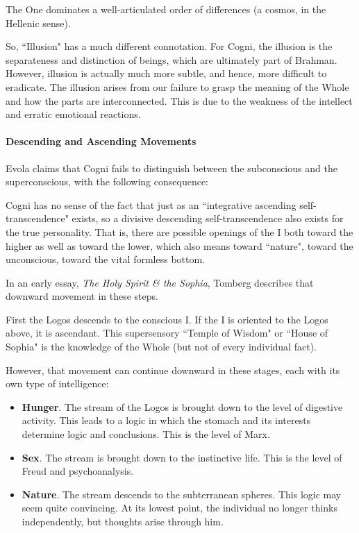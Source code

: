 \begin{quotex}
The One dominates a well-articulated order of differences (a cosmos, in the Hellenic sense). 

\end{quotex}
So, ``Illusion" has a much different connotation. For Cogni, the illusion is the separateness and distinction of beings, which are ultimately part of Brahman. However, illusion is actually much more subtle, and hence, more difficult to eradicate. The illusion arises from our failure to grasp the meaning of the Whole and how the parts are interconnected. This is due to the weakness of the intellect and erratic emotional reactions.

\paragraph{Descending and Ascending Movements}
Evola claims that Cogni fails to distinguish between the subconscious and the superconscious, with the following consequence:

\begin{quotex}
Cogni has no sense of the fact that just as an ``integrative ascending self-transcendence" exists, so a divisive descending self-transcendence also exists for the true personality. That is, there are possible openings of the I both toward the higher as well as toward the lower, which also means toward ``nature", toward the unconscious, toward the vital formless bottom. 

\end{quotex}
In an early essay, \emph{The Holy Spirit \& the Sophia}, Tomberg describes that downward movement in these steps.

First the Logos descends to the conscious I. If the I is oriented to the Logos above, it is ascendant. This supersensory ``Temple of Wisdom" or ``House of Sophia" is the knowledge of the Whole (but not of every individual fact).

However, that movement can continue downward in these stages, each with its own type of intelligence:

\begin{itemize}
\item \textbf{Hunger}. The stream of the Logos is brought down to the level of digestive activity. This leads to a logic in which the stomach and its interests determine logic and conclusions. This is the level of Marx. 
\item \textbf{Sex}. The stream is brought down to the instinctive life. This is the level of Freud and psychoanalysis. 
\item \textbf{Nature}. The stream descends to the subterranean spheres. This logic may seem quite convincing. At its lowest point, the individual no longer thinks independently, but thoughts arise through him. 
\end{itemize}
